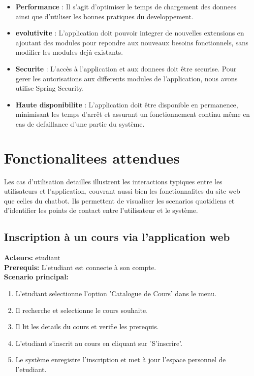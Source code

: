 \documentclass[a4paper, 11pt, openany]{report}
\begin{document}
\begin{itemize}
    \item \textbf{Performance} : Il s'agit d'optimiser le temps de chargement des donnees ainsi que d'utiliser les bonnes pratiques du developpement.
    \item \textbf{evolutivite} : L'application doit pouvoir integrer de nouvelles extensions en ajoutant des modules pour repondre aux nouveaux besoins fonctionnels, sans modifier les modules dejà existants.
    \item \textbf{Securite} : L'accès à l'application et aux donnees doit être securise. Pour gerer les autorisations aux differents modules de l'application, nous avons utilise Spring Security.
    \item \textbf{Haute disponibilite} : L'application doit être disponible en permanence, minimisant les temps d'arrêt et assurant un fonctionnement continu même en cas de defaillance d'une partie du système.
\end{itemize}


\section{Fonctionalitees attendues}

Les cas d'utilisation detailles illustrent les interactions typiques entre les utilisateurs et l'application, couvrant aussi bien les fonctionnalites du site web que celles du chatbot. Ils permettent de visualiser les scenarios quotidiens et d'identifier les points de contact entre l'utilisateur et le système.

\subsection{Inscription à un cours via l'application web}
\textbf{Acteurs:} etudiant \\
\textbf{Prerequis:} L'etudiant est connecte à son compte. \\
\textbf{Scenario principal:}
\begin{enumerate}
    \item L'etudiant selectionne l'option 'Catalogue de Cours' dans le menu.
    \item Il recherche et selectionne le cours souhaite.
    \item Il lit les details du cours et verifie les prerequis.
    \item L'etudiant s'inscrit au cours en cliquant sur 'S'inscrire'.
    \item Le système enregistre l'inscription et met à jour l'espace personnel de l'etudiant.
\end{enumerate}
\end{document}

